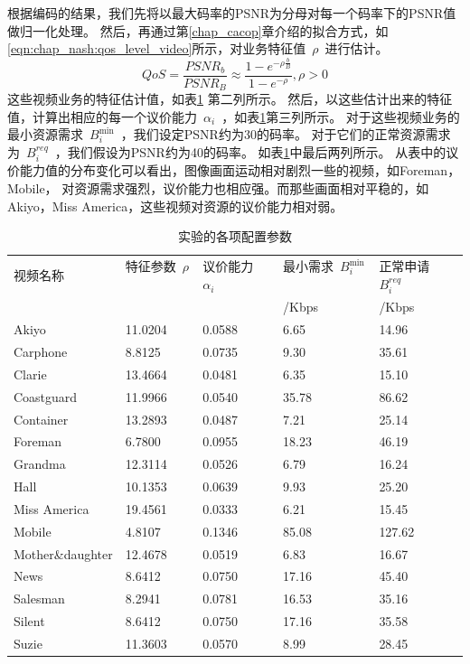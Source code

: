 根据编码的结果，我们先将以最大码率的PSNR为分母对每一个码率下的PSNR值做归一化处理。
然后，再通过第\ref{chap_cacop}章介绍的拟合方式，如\eqref{eqn:chap_nash:qos_level_video}所示，对业务特征值~$\rho$~进行估计。
\begin{equation}
QoS = \frac{PSNR_b}{PSNR_B} \approx \frac{1- e^{-\rho \frac{b}{B} }}{1-e^{-\rho}}, \rho > 0
\label{eqn:chap_nash:qos_level_video}
\end{equation}
这些视频业务的特征估计值，如表\ref{tab:chap_nash:before_simulation} 第二列所示。
然后，以这些估计出来的特征值，计算出相应的每一个议价能力~$\alpha_i$~，如表\ref{tab:chap_nash:before_simulation}第三列所示。
对于这些视频业务的最小资源需求~$B_i^{\min}$~，我们设定PSNR约为30的码率。
对于它们的正常资源需求为~$B_i^{req}$~，我们假设为PSNR约为40的码率。
如表\ref{tab:chap_nash:before_simulation}中最后两列所示。
从表中的议价能力值的分布变化可以看出，图像画面运动相对剧烈一些的视频，如Foreman，Mobile，
对资源需求强烈，议价能力也相应强。而那些画面相对平稳的，如Akiyo，Miss America，这些视频对资源的议价能力相对弱。
\begin{table}[tb]
    \wuhao
    \centering
    \caption{实验的各项配置参数}
    \begin{tabular*}{0.98\textwidth}{l p{}  p{}  p{}  p{} } 
    \toprule
    视频名称 &特征参数~$\rho$~ & 议价能力~$\alpha_i$~ & 最小需求~$B_i^{\min}$ ~ & 正常申请~$B_i^{req}$~ \\
    & & & /Kbps & /Kbps \\
    \midrule
Akiyo           	 & 11.0204 & 0.0588 & 6.65 & 14.96  \\ 
Carphone        	 & 8.8125 & 0.0735 & 9.30 & 35.61  \\ 
Clarie          	 & 13.4664 & 0.0481 & 6.35 & 15.10  \\ 
Coastguard      	 & 11.9966 & 0.0540 & 35.78 & 86.62  \\ 
Container       	 & 13.2893 & 0.0487 & 7.21 & 25.14  \\ 
Foreman         	 & 6.7800 & 0.0955 & 18.23 & 46.19  \\ 
Grandma         	 & 12.3114 & 0.0526 & 6.79 & 16.24  \\ 
Hall            	 & 10.1353 & 0.0639 & 9.93 & 25.20  \\ 
Miss America    	 & 19.4561 & 0.0333 & 6.21 & 15.45  \\ 
Mobile          	 & 4.8107 & 0.1346 & 85.08 & 127.62  \\ 
Mother\&daughter	 & 12.4678 & 0.0519 & 6.83 & 16.67  \\ 
News            	 & 8.6412 & 0.0750 & 17.16 & 45.40  \\ 
Salesman        	 & 8.2941 & 0.0781 & 16.53 & 35.16  \\ 
Silent          	 & 8.6412 & 0.0750 & 17.16 & 35.58  \\ 
Suzie           	 & 11.3603 & 0.0570 & 8.99 & 28.45  \\ 
    \bottomrule
         \end{tabular*}
    \label{tab:chap_nash:before_simulation}
\end{table}

